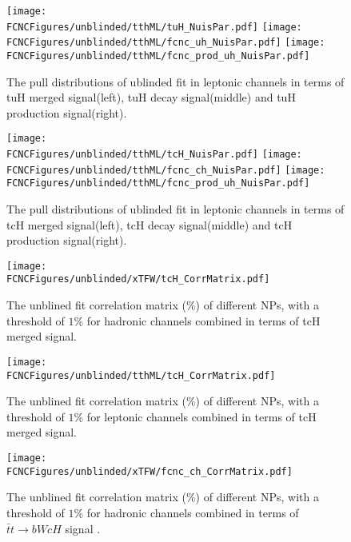 \begin{figure}[H]
\centering
\texttt{[image: \\FCNCFigures/unblinded/tthML/tuH\_NuisPar.pdf]}
\texttt{[image: \\FCNCFigures/unblinded/tthML/fcnc\_uh\_NuisPar.pdf]}
\texttt{[image: \\FCNCFigures/unblinded/tthML/fcnc\_prod\_uh\_NuisPar.pdf]}
\caption{The pull distributions of ublinded fit in leptonic channels in terms of tuH merged signal(left), tuH decay signal(middle) and tuH production signal(right).}
\label{fig:tuH_NuisPar_unblind_lep}
\end{figure}

\begin{figure}[H]
\centering
\texttt{[image: \\FCNCFigures/unblinded/tthML/tcH\_NuisPar.pdf]}
\texttt{[image: \\FCNCFigures/unblinded/tthML/fcnc\_ch\_NuisPar.pdf]}
\texttt{[image: \\FCNCFigures/unblinded/tthML/fcnc\_prod\_uh\_NuisPar.pdf]}
\caption{The pull distributions of ublinded fit in leptonic channels in terms of tcH merged signal(left), tcH decay signal(middle) and tcH production signal(right).}
\label{fig:tcH_NuisPar_unblind_lep}
\end{figure}



\begin{figure}[H]
\centering
\texttt{[image: \\FCNCFigures/unblinded/xTFW/tcH\_CorrMatrix.pdf]}
\caption{ The unblined fit correlation matrix ($\%$) of different NPs, with a threshold of $1\%$ for hadronic channels combined in terms of tcH merged signal.}
\label{fig:tcH_CorrMatrix_1}
\end{figure}

\begin{figure}[H]
\centering
\texttt{[image: \\FCNCFigures/unblinded/tthML/tcH\_CorrMatrix.pdf]}
\caption{ The unblined fit correlation matrix ($\%$) of different NPs, with a threshold of $1\%$ for leptonic channels combined in terms of tcH merged signal.}
\label{fig:tcH_CorrMatrix_2}
\end{figure}


\begin{figure}[H]
\centering
\texttt{[image: \\FCNCFigures/unblinded/xTFW/fcnc\_ch\_CorrMatrix.pdf]}
\caption{ The unblined fit correlation matrix ($\%$) of different NPs, with a threshold of $1\%$ for hadronic channels combined in terms of $\bar{t}t\to bWcH$ signal . }
\label{fig:fcnc_ch_CorrMatrix_1}
\end{figure}

